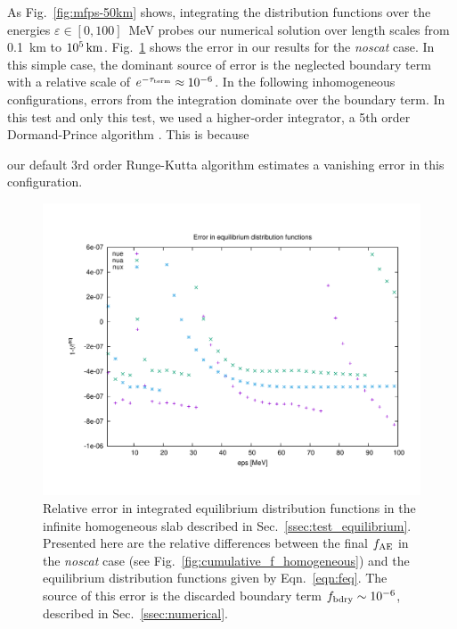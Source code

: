 \documentclass[aps,floatfix,prd,superscriptaddress,twocolumn]{revtex4-1}
\newcommand{\todo}[1]{\marginpar{\tiny{\textcolor{red}{#1}}}}
\renewcommand\todo[1]{} %
\begin{document}
As Fig.~\ref{fig:mfps-50km} shows, integrating the distribution functions
over the energies $\varepsilon\in[0,100]$~MeV
probes our numerical solution over length scales from
0.1~km to $10^{5}\,{\rm km}$.
Fig.~\ref{fig:homogeneous_isotropic} shows the error in our results for
the \emph{noscat} case.
In this simple case, the dominant source of error is the neglected
boundary term with a relative scale of $e^{-\tau_{\rm term}}\approx10^{-6}$.
In the following inhomogeneous configurations,
errors from the integration dominate over the boundary term.
In this test and only this test, we used a higher-order integrator, a 5th
order Dormand-Prince algorithm \cite{pres2007-nr_3rd_ed}. This is because
\todo{discuss with Matt}
our default 3rd order Runge-Kutta algorithm estimates a vanishing error
in this configuration.

\begin{figure}
  \includegraphics[width=\columnwidth]{figure-ferr-50km}
  \caption{Relative error in integrated equilibrium distribution functions
    in the infinite homogeneous slab  described in
    Sec.~\ref{ssec:test_equilibrium}.
    Presented here are the relative differences between the final
    $f_{\rm AE}$ in the \emph{noscat} case
    (see Fig.~\ref{fig:cumulative_f_homogeneous})
    and the equilibrium distribution functions given by
    Eqn.~\ref{eqn:feq}.
    The source of this error is the discarded boundary term
    $f_{\rm bdry}\sim10^{-6}$, described in Sec.~\ref{ssec:numerical}.
  }
  \label{fig:homogeneous_isotropic}
\end{figure}
\end{document}
